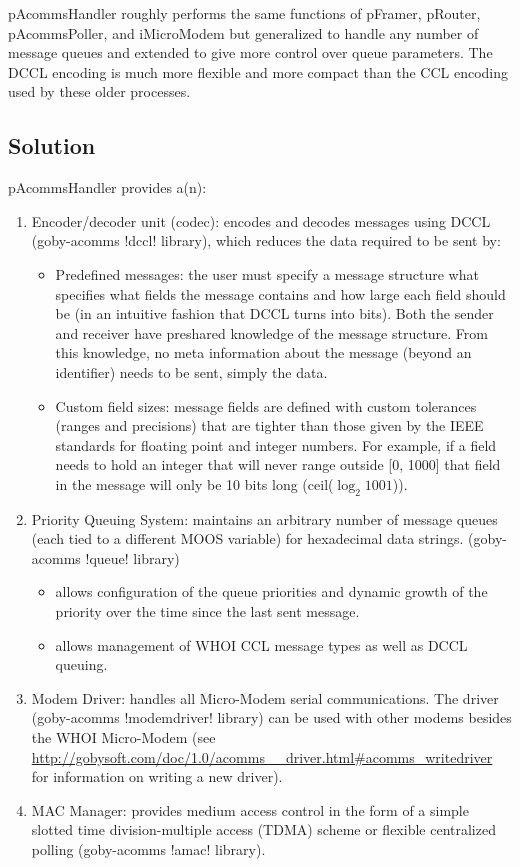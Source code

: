 pAcommsHandler roughly performs the same functions of pFramer, pRouter, pAcommsPoller, and iMicroModem but
generalized to handle any number of message queues and extended to give more control over queue parameters. The DCCL encoding is much more flexible and more compact than the CCL encoding used by these older processes.

\subsection{Solution}
pAcommsHandler provides a(n):
\begin{enumerate}
\item Encoder/decoder unit (codec): encodes and decodes messages using DCCL (goby-acomms !dccl! library), which reduces the data required to be sent by:
\begin{itemize}
\item Predefined messages: the user must specify a message structure what specifies what fields the message contains and how large each field should be (in an intuitive fashion that DCCL turns into bits). Both the sender and receiver have preshared knowledge of the message structure. From this knowledge, no meta information about the message (beyond an identifier) needs to be sent, simply the data. 
\item Custom field sizes: message fields are defined with custom tolerances (ranges and precisions) that are tighter than those given by the IEEE standards for floating point and integer numbers. For example, if a field needs to hold an integer that will never range outside [0, 1000] that field in the message will only be 10 bits long (ceil($\log_2{1001}$)).
\end{itemize}
\item Priority Queuing System: maintains an arbitrary number of message queues (each tied to a different MOOS variable) for hexadecimal data strings. (goby-acomms !queue! library)
\begin{itemize} 
\item allows configuration of the queue priorities and dynamic growth of the priority over the time since the last sent message.
\item allows management of WHOI CCL message types as well as DCCL queuing. 
\end{itemize}
\item Modem Driver: handles all Micro-Modem serial communications. The driver (goby-acomms !modemdriver! library) can be used with other modems besides the WHOI Micro-Modem (see \url{http://gobysoft.com/doc/1.0/acomms__driver.html#acomms_writedriver} for information on writing a new driver). 
\item MAC Manager: provides medium access control in the form of a simple slotted time division-multiple access (TDMA) scheme or flexible centralized polling (goby-acomms !amac! library).
\end{enumerate}

